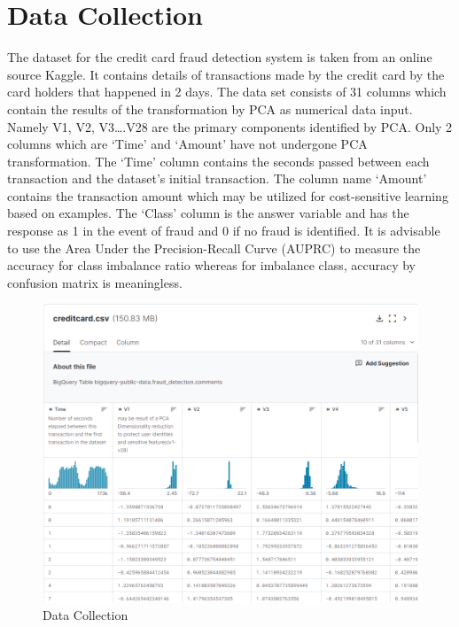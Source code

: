 \section{Data Collection}
The dataset for the credit card fraud detection system is taken from an online source Kaggle. It contains details of transactions made by the credit card by the card holders that happened in 2 days. The data set consists of 31 columns which contain the results of the transformation by PCA as numerical data input. Namely V1, V2, V3….V28 are the primary components identified by PCA. Only 2 columns which are ‘Time’ and ‘Amount’ have not undergone PCA transformation. The ‘Time’ column contains the seconds passed between each transaction and the dataset’s initial transaction. The column name ‘Amount’ contains the transaction amount which may be utilized for cost-sensitive learning based on examples. The ‘Class’ column is the answer variable and has the response as 1 in the event of fraud and 0 if no fraud is identified. It is advisable to use the Area Under the Precision-Recall Curve (AUPRC) to measure the accuracy for class imbalance ratio whereas for imbalance class, accuracy by confusion matrix is meaningless.

\begin{figure}[ht]
    \centering
    \includegraphics[scale=0.8]{figures/Datacollection.png}
    \caption{Data Collection}
    \label{fig: Data Collection}
\end{figure}

